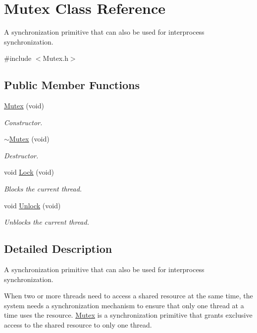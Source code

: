\hypertarget{class_mutex}{\section{Mutex Class Reference}
\label{class_mutex}
}


A synchronization primitive that can also be used for interprocess synchronization.  




{\ttfamily \#include $<$Mutex.\-h$>$}

\subsection*{Public Member Functions}
\begin{DoxyCompactItemize}
\item 
\hyperlink{class_mutex_a00b2ff557451955a905ecdca2855389b}{Mutex} (void)
\begin{DoxyCompactList}\small\item\em Constructor. \end{DoxyCompactList}\item 
\hyperlink{class_mutex_a115e8bae072b7d0767f75bc3369d521d}{$\sim$\-Mutex} (void)
\begin{DoxyCompactList}\small\item\em Destructor. \end{DoxyCompactList}\item 
void \hyperlink{class_mutex_a1726d7244983f7be74fcfa9cfb63745f}{Lock} (void)
\begin{DoxyCompactList}\small\item\em Blocks the current thread. \end{DoxyCompactList}\item 
void \hyperlink{class_mutex_a03150e8fa423f7e042661d350d238b84}{Unlock} (void)
\begin{DoxyCompactList}\small\item\em Unblocks the current thread. \end{DoxyCompactList}\end{DoxyCompactItemize}


\subsection{Detailed Description}
A synchronization primitive that can also be used for interprocess synchronization. 

When two or more threads need to access a shared resource at the same time, the system needs a synchronization mechanism to ensure that only one thread at a time uses the resource. \hyperlink{class_mutex}{Mutex} is a synchronization primitive that grants exclusive access to the shared resource to only one thread. 

